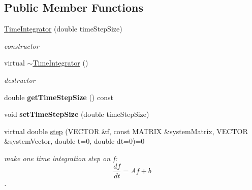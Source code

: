 \subsection*{Public Member Functions}
\begin{DoxyCompactItemize}
\item 
\hypertarget{classnatrium_1_1TimeIntegrator_a667fa724e41c57132c75562b5ce6fd56}{
\hyperlink{classnatrium_1_1TimeIntegrator_a667fa724e41c57132c75562b5ce6fd56}{TimeIntegrator} (double timeStepSize)}
\label{classnatrium_1_1TimeIntegrator_a667fa724e41c57132c75562b5ce6fd56}

\begin{DoxyCompactList}\small\item\em constructor \item\end{DoxyCompactList}\item 
\hypertarget{classnatrium_1_1TimeIntegrator_a8795d06c5322b72a5a2a1f30aa7a051d}{
virtual \hyperlink{classnatrium_1_1TimeIntegrator_a8795d06c5322b72a5a2a1f30aa7a051d}{$\sim$TimeIntegrator} ()}
\label{classnatrium_1_1TimeIntegrator_a8795d06c5322b72a5a2a1f30aa7a051d}

\begin{DoxyCompactList}\small\item\em destructor \item\end{DoxyCompactList}\item 
\hypertarget{classnatrium_1_1TimeIntegrator_a6e763133e114cdd758307ca30b65f161}{
double {\bfseries getTimeStepSize} () const }
\label{classnatrium_1_1TimeIntegrator_a6e763133e114cdd758307ca30b65f161}

\item 
\hypertarget{classnatrium_1_1TimeIntegrator_a18592866e946c63ab1595d3ab688ea6b}{
void {\bfseries setTimeStepSize} (double timeStepSize)}
\label{classnatrium_1_1TimeIntegrator_a18592866e946c63ab1595d3ab688ea6b}

\item 
virtual double \hyperlink{classnatrium_1_1TimeIntegrator_a0237ebbaf737c7d3278777fb08007e99}{step} (VECTOR \&f, const MATRIX \&systemMatrix, VECTOR \&systemVector, double t=0, double dt=0)=0
\begin{DoxyCompactList}\small\item\em make one time integration step on f: \[ \frac{df}{dt} = Af+b \]. \item\end{DoxyCompactList}\end{DoxyCompactItemize}


